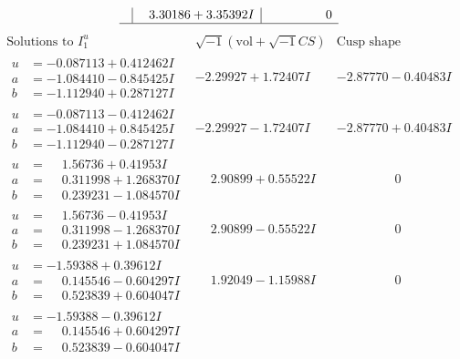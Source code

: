\documentclass[1p]{elsarticle_modified}
\theoremstyle{definition}
\newcommand{\I}{\sqrt{-1}}
\begin{document}
$$\begin{array}{c|c|c}
 & \phantom{-}3.30186 + 3.35392 I & \phantom{-0.000000 } 0\\
 \hline 
 \end{array}$$\newpage$$\begin{array}{c|c|c}  
\text{Solutions to }I^u_{1}& \I (\text{vol} + \sqrt{-1}CS) & \text{Cusp shape}\\
 \hline 
\begin{aligned}
u &= -0.087113 + 0.412462 I \\
a &= -1.084410 - 0.845425 I \\
b &= -1.112940 + 0.287127 I\end{aligned}
 & -2.29927 + 1.72407 I & -2.87770 - 0.40483 I \\ \hline\begin{aligned}
u &= -0.087113 - 0.412462 I \\
a &= -1.084410 + 0.845425 I \\
b &= -1.112940 - 0.287127 I\end{aligned}
 & -2.29927 - 1.72407 I & -2.87770 + 0.40483 I \\ \hline\begin{aligned}
u &= \phantom{-}1.56736 + 0.41953 I \\
a &= \phantom{-}0.311998 + 1.268370 I \\
b &= \phantom{-}0.239231 - 1.084570 I\end{aligned}
 & \phantom{-}2.90899 + 0.55522 I & \phantom{-0.000000 } 0 \\ \hline\begin{aligned}
u &= \phantom{-}1.56736 - 0.41953 I \\
a &= \phantom{-}0.311998 - 1.268370 I \\
b &= \phantom{-}0.239231 + 1.084570 I\end{aligned}
 & \phantom{-}2.90899 - 0.55522 I & \phantom{-0.000000 } 0 \\ \hline\begin{aligned}
u &= -1.59388 + 0.39612 I \\
a &= \phantom{-}0.145546 - 0.604297 I \\
b &= \phantom{-}0.523839 + 0.604047 I\end{aligned}
 & \phantom{-}1.92049 - 1.15988 I & \phantom{-0.000000 } 0 \\ \hline\begin{aligned}
u &= -1.59388 - 0.39612 I \\
a &= \phantom{-}0.145546 + 0.604297 I \\
b &= \phantom{-}0.523839 - 0.604047 I\end{aligned}

\end{array}$$
\end{document}
